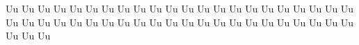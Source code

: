 \documentclass{worksheet}
\begin{document}
\begin{drillsheet}
\calligra
Uu Uu Uu Uu Uu Uu Uu Uu Uu Uu Uu Uu Uu Uu Uu Uu Uu Uu Uu Uu Uu Uu Uu Uu Uu Uu Uu Uu Uu Uu Uu Uu Uu Uu Uu Uu Uu Uu Uu Uu Uu Uu Uu Uu Uu Uu Uu
\end{drillsheet}
\end{document}
